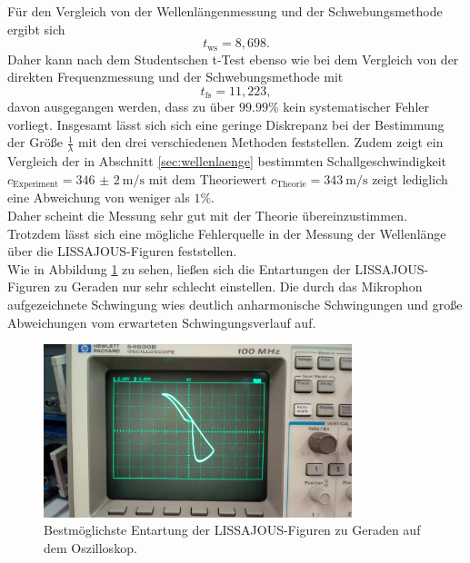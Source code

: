 Für den Vergleich von der Wellenlängenmessung und der Schwebungsmethode ergibt sich
\begin{equation*}
	t_{\mathrm{ws}} = 8,698 \mathrm{.}
\end{equation*}
Daher kann nach dem Studentschen t-Test ebenso wie bei dem Vergleich von der direkten Frequenzmessung und der Schwebungsmethode
mit
\begin{equation*}
	t_{\mathrm{fs}} = 11,223 \mathrm{,}
\end{equation*}
davon ausgegangen werden, dass zu über $99.99\%$ kein systematischer Fehler vorliegt.
Insgesamt lässt sich sich eine geringe Diskrepanz bei der Bestimmung der Größe $\frac{1}{\lambda}$ mit den drei verschiedenen Methoden feststellen.
Zudem zeigt ein Vergleich der in Abschnitt \ref{sec:wellenlaenge} bestimmten Schallgeschwindigkeit $c_{\mathrm{Experiment}}=\SI{346(2)}{\meter\per\second}$ mit dem Theoriewert $c_{\mathrm{Theorie}}=\SI{343}{\meter\per\second}$ \cite{schall} zeigt lediglich
eine Abweichung von weniger als $1\%$.
\\Daher scheint die Messung sehr gut mit der Theorie übereinzustimmen.
\\Trotzdem lässt sich eine mögliche Fehlerquelle in der Messung der Wellenlänge über die LISSAJOUS-Figuren feststellen.
\\Wie in Abbildung \ref{fig:Lisas} zu sehen, ließen sich die Entartungen der LISSAJOUS-Figuren zu Geraden nur sehr schlecht einstellen. Die durch das Mikrophon aufgezeichnete Schwingung wies deutlich anharmonische Schwingungen und große Abweichungen vom erwarteten Schwingungsverlauf auf.

\begin{figure}
	\centering
	\includegraphics[width=0.8\textwidth]{Bilder/lissajou.jpeg}
	\caption{Bestmöglichste Entartung der LISSAJOUS-Figuren zu Geraden auf dem Oszilloskop.}
	\label{fig:Lisas}
\end{figure}
